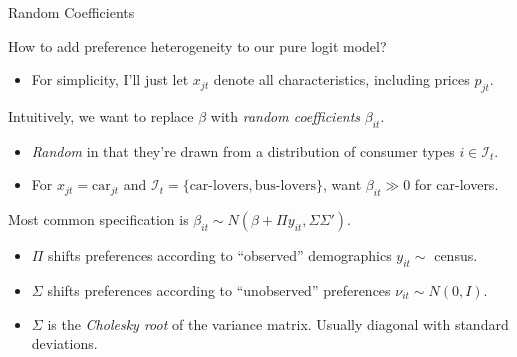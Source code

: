 \documentclass[aspectratio=169,t,11pt,table]{beamer}
\begin{document}
\begin{frame}{Random Coefficients}
    \vspace{-\baselineskip}
    \begin{minipage}[c][4\baselineskip][c]{\textwidth}
    \end{minipage}
    \vspace{-1\baselineskip}
    \begin{wideitemize}
        \item How to add preference heterogeneity to our pure logit model?
        \begin{itemize}
            \item For simplicity, I'll just let $x_{jt}$ denote all characteristics, including prices $p_{jt}$.
        \end{itemize}
        \pause
        \item Intuitively, we want to replace $\beta$ with \textit{random coefficients} \alert{$\beta_{it}$}.
        \begin{itemize}
            \item \textit{Random} in that they're drawn from a distribution of consumer types $i \in \mathcal{I}_t$.
            \item For $x_{jt} = \text{car}_{jt}$ and $\mathcal{I}_t = \{\text{car-lovers}, \text{bus-lovers}\}$, want $\beta_{it} \gg 0$ for car-lovers.
        \end{itemize}
        \pause
        \item Most common specification is \alert{$\beta_{it} \sim N(\beta + \Pi y_{it}, \Sigma\Sigma')$}.
        \begin{itemize}
            \item $\Pi$ shifts preferences according to ``observed'' demographics $y_{it} \sim $ census.
            \item $\Sigma$ shifts preferences according to ``unobserved'' preferences $\nu_{it} \sim N(0, I)$.
            \item $\Sigma$ is the \textit{Cholesky root} of the variance matrix. Usually diagonal with standard deviations.
        \end{itemize}
    \end{wideitemize}
\end{frame}
\end{document}
